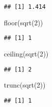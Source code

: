 \documentclass[
]{article}
\newenvironment{Shaded}{\begin{snugshade}}{\end{snugshade}}
\newcommand{\DecValTok}[1]{\textcolor[rgb]{0.00,0.00,0.81}{#1}}
\newcommand{\FunctionTok}[1]{\textcolor[rgb]{0.00,0.00,0.00}{#1}}
\newcommand{\NormalTok}[1]{#1}
\begin{document}
\begin{verbatim}
## [1] 1.414
\end{verbatim}

\begin{Shaded}
\begin{Highlighting}[]
\FunctionTok{floor}\NormalTok{(}\FunctionTok{sqrt}\NormalTok{(}\DecValTok{2}\NormalTok{))}
\end{Highlighting}
\end{Shaded}

\begin{verbatim}
## [1] 1
\end{verbatim}

\begin{Shaded}
\begin{Highlighting}[]
\FunctionTok{ceiling}\NormalTok{(}\FunctionTok{sqrt}\NormalTok{(}\DecValTok{2}\NormalTok{))}
\end{Highlighting}
\end{Shaded}

\begin{verbatim}
## [1] 2
\end{verbatim}

\begin{Shaded}
\begin{Highlighting}[]
\FunctionTok{trunc}\NormalTok{(}\FunctionTok{sqrt}\NormalTok{(}\DecValTok{2}\NormalTok{))}
\end{Highlighting}
\end{Shaded}

\begin{verbatim}
## [1] 1
\end{verbatim}
\end{document}
